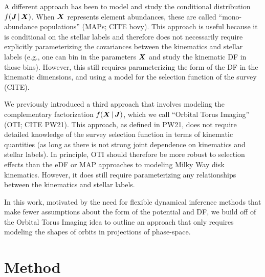 A different approach has been to model and study the conditional distribution $f(\boldsymbol{J}
\,|\, \boldsymbol{X})$.
When $\boldsymbol{X}$ represents element abundances, these are called ``mono-abundance
populations'' (MAPs; CITE bovy).
This approach is useful because it is conditional on the stellar labels and therefore
does not necessarily require explicitly parameterizing the covariances between the
kinematics and stellar labels (e.g., one can bin in the parameters $\boldsymbol{X}$ and study
the kinematic DF in those bins).
However, this still requires parameterizing the form of the DF in the kinematic
dimensions, and using a model for the selection function of the survey (CITE).

We previously introduced a third approach that involves modeling the complementary
factorization $f(\boldsymbol{X} \,|\, \boldsymbol{J})$, which we call ``Orbital Torus Imaging'' (OTI;
CITE PW21).
This approach, as defined in PW21, does not require detailed knowledge of the survey
selection function in terms of kinematic quantities (as long as there is not strong
joint dependence on kinematics and stellar labels).
In principle, OTI should therefore be more robust to selection effects than the eDF or
MAP approaches to modeling Milky Way disk kinematics.
However, it does still require parameterizing any relationships between the kinematics
and stellar labels.

In this work, motivated by the need for flexible dynamical inference methods that make
fewer assumptions about the form of the potential and DF, we build off of the Orbital
Torus Imaging idea to outline an approach that only requires modeling the shapes of
orbits in projections of phase-space.





\section{Method} \label{sec:method}



